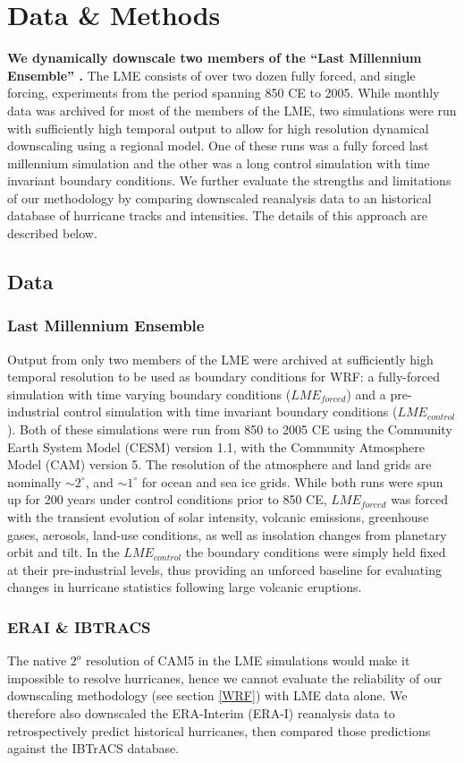 \documentclass[smallextended]{svjour3}       %
\begin{document}
\section{Data \& Methods}
\label{methods}
\textbf{We dynamically downscale two members of the ``Last Millennium
  Ensemble'' \cite{gcm_lme}.} The LME consists of over two dozen
fully forced, and single forcing, experiments from the period spanning
850 CE to 2005. While monthly data was archived for most of the
members of the LME, two simulations were run with sufficiently high
temporal output to allow for high resolution dynamical downscaling
using a regional model. One of these runs was a fully forced last
millennium simulation and the other was a long control simulation with
time invariant boundary conditions. We further evaluate the strengths
and limitations of our methodology by comparing downscaled reanalysis
data to an historical database of hurricane tracks and
intensities. The details of this approach are described below.

\subsection{Data}
\subsubsection{Last Millennium Ensemble}
Output from only two members of the LME were archived at sufficiently
high temporal resolution to be used as boundary conditions for WRF: a
fully-forced simulation with time varying boundary conditions
($LME_{forced}$) and a pre-industrial control simulation with time
invariant boundary conditions ($LME_{control}$). Both of these
simulations were run from 850 to 2005 CE using the Community Earth
System Model (CESM) version 1.1, with the Community Atmosphere Model
(CAM) version 5. The resolution of the atmosphere and land grids are
nominally ${\sim}2^\circ$, and ${\sim}1^\circ$ for ocean and sea ice
grids. While both runs were spun up for 200 years under control
conditions prior to 850 CE, $LME_{forced}$ was forced with the
transient evolution of solar intensity, volcanic emissions, greenhouse
gases, aerosols, land-use conditions, as well as insolation changes
from planetary orbit and tilt. In the $LME_{control}$ the boundary
conditions were simply held fixed at their pre-industrial levels, thus
providing an unforced baseline for evaluating changes
in hurricane statistics following large volcanic eruptions.

\subsubsection{ERAI \& IBTRACS}
The native $2^o$ resolution of CAM5 in the LME simulations would make
it impossible to resolve hurricanes, hence we cannot evaluate the
reliability of our downscaling methodology (see section \ref{WRF}) with LME
data alone. We therefore also downscaled the ERA-Interim (ERA-I)
\cite{erai_reanal} reanalysis data to retrospectively predict historical
hurricanes, then compared those predictions against the IBTrACS
\cite{ibtracs} database.
\end{document}
